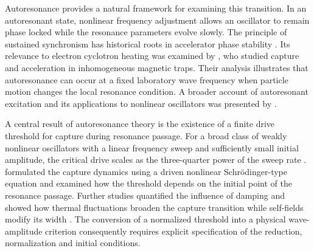 \documentclass{jpp}
\begin{document}
Autoresonance provides a natural framework for examining this transition. In an autoresonant state, nonlinear frequency adjustment allows an oscillator to remain phase locked while the resonance parameters evolve slowly. The principle of sustained synchronism has historical roots in accelerator phase stability \citep{McMillan1945}. Its relevance to electron cyclotron heating was examined by \citet{NeishtadtTimofeev1987}, who studied capture and acceleration in inhomogeneous magnetic traps. Their analysis illustrates that autoresonance can occur at a fixed laboratory wave frequency when particle motion changes the local resonance condition. A broader account of autoresonant excitation and its applications to nonlinear oscillators was presented by \citet{FajansFriedland2001}.


A central result of autoresonance theory is the existence of a finite drive threshold for capture during resonance passage. For a broad class of weakly nonlinear oscillators with a linear frequency sweep and sufficiently small initial amplitude, the critical drive scales as the three-quarter power of the sweep rate \citep{FajansFriedland2001}. \citet{Friedland2008} formulated the capture dynamics using a driven nonlinear Schr\"odinger-type equation and examined how the threshold depends on the initial point of the resonance passage. Further studies quantified the influence of damping \citep{FajansGilsonFriedland2001} and showed how thermal fluctuations broaden the capture transition while self-fields modify its width \citep{Barth2009}. The conversion of a normalized threshold into a physical wave-amplitude criterion consequently requires explicit specification of the reduction, normalization and initial conditions.

\end{document}
